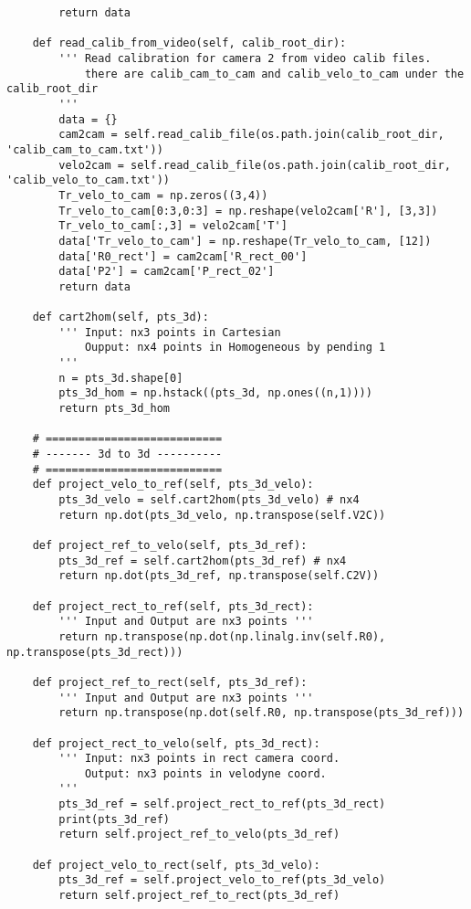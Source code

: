 \begin{lstlisting}
        return data
    
    def read_calib_from_video(self, calib_root_dir):
        ''' Read calibration for camera 2 from video calib files.
            there are calib_cam_to_cam and calib_velo_to_cam under the calib_root_dir
        '''
        data = {}
        cam2cam = self.read_calib_file(os.path.join(calib_root_dir, 'calib_cam_to_cam.txt'))
        velo2cam = self.read_calib_file(os.path.join(calib_root_dir, 'calib_velo_to_cam.txt'))
        Tr_velo_to_cam = np.zeros((3,4))
        Tr_velo_to_cam[0:3,0:3] = np.reshape(velo2cam['R'], [3,3])
        Tr_velo_to_cam[:,3] = velo2cam['T']
        data['Tr_velo_to_cam'] = np.reshape(Tr_velo_to_cam, [12])
        data['R0_rect'] = cam2cam['R_rect_00']
        data['P2'] = cam2cam['P_rect_02']
        return data

    def cart2hom(self, pts_3d):
        ''' Input: nx3 points in Cartesian
            Oupput: nx4 points in Homogeneous by pending 1
        '''
        n = pts_3d.shape[0]
        pts_3d_hom = np.hstack((pts_3d, np.ones((n,1))))
        return pts_3d_hom
 
    # =========================== 
    # ------- 3d to 3d ---------- 
    # =========================== 
    def project_velo_to_ref(self, pts_3d_velo):
        pts_3d_velo = self.cart2hom(pts_3d_velo) # nx4
        return np.dot(pts_3d_velo, np.transpose(self.V2C))

    def project_ref_to_velo(self, pts_3d_ref):
        pts_3d_ref = self.cart2hom(pts_3d_ref) # nx4
        return np.dot(pts_3d_ref, np.transpose(self.C2V))

    def project_rect_to_ref(self, pts_3d_rect):
        ''' Input and Output are nx3 points '''
        return np.transpose(np.dot(np.linalg.inv(self.R0), np.transpose(pts_3d_rect)))
    
    def project_ref_to_rect(self, pts_3d_ref):
        ''' Input and Output are nx3 points '''
        return np.transpose(np.dot(self.R0, np.transpose(pts_3d_ref)))
 
    def project_rect_to_velo(self, pts_3d_rect):
        ''' Input: nx3 points in rect camera coord.
            Output: nx3 points in velodyne coord.
        ''' 
        pts_3d_ref = self.project_rect_to_ref(pts_3d_rect)
        print(pts_3d_ref)
        return self.project_ref_to_velo(pts_3d_ref)

    def project_velo_to_rect(self, pts_3d_velo):
        pts_3d_ref = self.project_velo_to_ref(pts_3d_velo)
        return self.project_ref_to_rect(pts_3d_ref)


\end{lstlisting}
